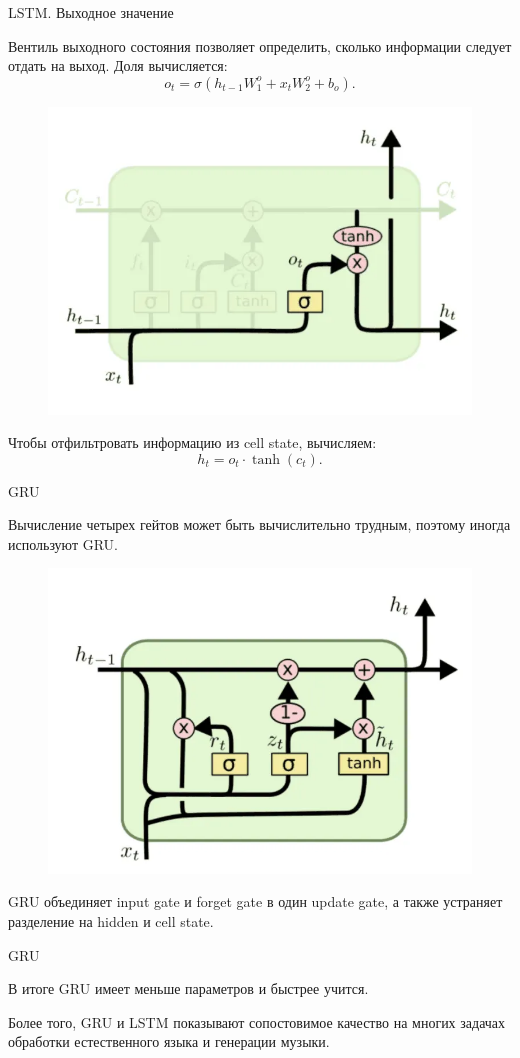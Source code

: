 \documentclass[notheorems, handout, 10pt]{beamer}
\begin{document}
	\begin{frame}{LSTM. Выходное значение}
		
		Вентиль выходного состояния позволяет определить, сколько информации следует отдать на выход. Доля вычисляется: $$o_t=\sigma(h_{t-1}W_1^o + x_tW_2^o +b_o).$$
		
		\begin{figure}[H]
			\includegraphics[width=0.5\linewidth]{images/10}
		\end{figure}
		
		Чтобы отфильтровать информацию из cell state, вычисляем: $$h_t=o_t \cdot \tanh(c_t).$$
		
		\note{}
		
	\end{frame}
	
	\begin{frame}{GRU}
		
		Вычисление четырех гейтов может быть вычислительно трудным, поэтому иногда используют GRU.
		
		\begin{figure}[H]
			\includegraphics[width=0.5\linewidth]{images/11}
		\end{figure}
		
		GRU объединяет input gate и forget gate в один update gate, а также устраняет разделение на hidden и cell state.
		
		\note{}
		
	\end{frame}
	
	\begin{frame}{GRU}
		
		В итоге GRU имеет меньше параметров и быстрее учится. 
		
		\vspace{0.5cm}
		
		Более того, GRU и LSTM показывают сопостовимое качество на многих задачах обработки естественного языка и генерации музыки.
		
		\note{}
		
	\end{frame}
	
\end{document}
